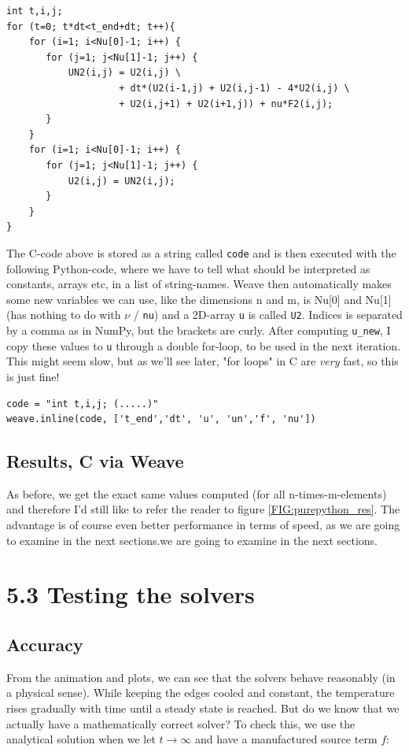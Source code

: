 \documentclass[a4paper]{article}
\begin{document}
\begin{verbatim}
int t,i,j;
for (t=0; t*dt<t_end+dt; t++){
    for (i=1; i<Nu[0]-1; i++) {
       for (j=1; j<Nu[1]-1; j++) {
           UN2(i,j) = U2(i,j) \
                    + dt*(U2(i-1,j) + U2(i,j-1) - 4*U2(i,j) \
                    + U2(i,j+1) + U2(i+1,j)) + nu*F2(i,j);
       }
    }
    for (i=1; i<Nu[0]-1; i++) {
       for (j=1; j<Nu[1]-1; j++) {
           U2(i,j) = UN2(i,j);
       }
    }
}
\end{verbatim}

The C-code above is stored as a string called \texttt{code} and is then executed with the following Python-code, where we have to tell what should be interpreted as constants, arrays etc, in a list of string-names. Weave then automatically makes some new variables we can use, like the dimensions n and m, is Nu[0] and Nu[1] (has nothing to do with $\nu$ / \texttt{nu}) and a 2D-array \texttt{u} is called \texttt{U2}. Indices is separated by a comma as in NumPy, but the brackets are curly. After computing \texttt{u\_new}, I copy these values to \texttt{u} through a double for-loop, to be used in the next iteration. This might seem slow, but as we'll see later, "for loops" in C are \textit{very} fast, so this is just fine!
\newline

\begin{verbatim}
code = "int t,i,j; (.....)"
weave.inline(code, ['t_end','dt', 'u', 'un','f', 'nu'])
\end{verbatim}

\subsection*{Results, C via Weave}
As before, we get the exact same values computed (for all n-times-m-elements) and therefore I'd still like to refer the reader to figure \ref{FIG:purepython_res}. The advantage is of course even better performance in terms of speed, as we are going to examine in the next sections.we are going to examine in the next sections.

\section*{5.3 Testing the solvers}
\subsection*{Accuracy}
From the animation and plots, we can see that the solvers behave reasonably (in a physical sense). While keeping the edges cooled and constant, the temperature rises gradually with time until a steady state is reached. But do we know that we actually have a mathematically correct solver? To check this, we use the analytical solution when we let $t\rightarrow \infty$ and have a manufactured source term $f$:
\end{document}
